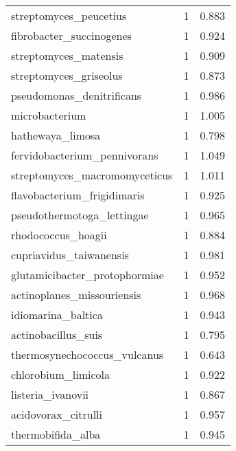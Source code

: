\begin{tabular}{lrr}
                      streptomyces\_peucetius &                   1 &     0.883 \\
                    fibrobacter\_succinogenes &                   1 &     0.924 \\
                       streptomyces\_matensis &                   1 &     0.909 \\
                      streptomyces\_griseolus &                   1 &     0.873 \\
                   pseudomonas\_denitrificans &                   1 &     0.986 \\
                              microbacterium &                   1 &     1.005 \\
                            hathewaya\_limosa &                   1 &     0.798 \\
                fervidobacterium\_pennivorans &                   1 &     1.049 \\
               streptomyces\_macromomyceticus &                   1 &     1.011 \\
                 flavobacterium\_frigidimaris &                   1 &     0.925 \\
                  pseudothermotoga\_lettingae &                   1 &     0.965 \\
                          rhodococcus\_hoagii &                   1 &     0.884 \\
                     cupriavidus\_taiwanensis &                   1 &     0.981 \\
               glutamicibacter\_protophormiae &                   1 &     0.952 \\
                  actinoplanes\_missouriensis &                   1 &     0.968 \\
                          idiomarina\_baltica &                   1 &     0.943 \\
                         actinobacillus\_suis &                   1 &     0.795 \\
                thermosynechococcus\_vulcanus &                   1 &     0.643 \\
                         chlorobium\_limicola &                   1 &     0.922 \\
                           listeria\_ivanovii &                   1 &     0.867 \\
                         acidovorax\_citrulli &                   1 &     0.957 \\
                           thermobifida\_alba &                   1 &     0.945 \\

\end{tabular}
